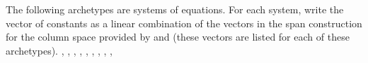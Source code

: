 The following archetypes are systems of equations.  For each system, write the vector of constants as a linear combination of the vectors in the span construction for the column space provided by  and  (these vectors are listed for each of these archetypes).\newline\newline
{},
,
,
,
,
,
,
,
,


